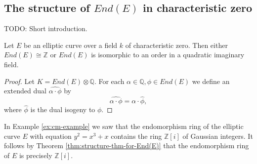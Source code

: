 \subsection{The structure of $End(E)$ in characteristic zero}
\label{sec:struct-ende-char-zero}

TODO: Short introduction.

\begin{thm}
  \label{thm:structure-thm-for-End(E)}
  Let $E$ be an elliptic curve over a field $k$ of characteristic zero.  Then either
  $End(E) \cong \mathbb{Z}$ or $End(E)$ is isomorphic to an order in a quadratic
  imaginary field.
\end{thm}
\begin{proof}
  Let $K = End(E) \otimes \mathbb{Q}$.  For each $\alpha \in \mathbb{Q}, \phi \in
  End(E)$ we define an extended dual $\widehat{\alpha \cdot \phi}$ by
  \begin{equation*}
    \widehat{\alpha \cdot \phi} = \alpha \cdot \hat{\phi},
  \end{equation*}
  where $\hat{\phi}$ is the dual isogeny to $\phi$.  
\end{proof}

In Example \ref{ex:cm-example} we saw that the endomorphism ring of the elliptic
curve $E$ with equation $y^{2} = x^{3} + x$ contains the ring $\mathbb{Z}[i]$ of
Gaussian integers.  It follows by Theorem \ref{thm:structure-thm-for-End(E)} that the
endomorphism ring of $E$ is precisely $\mathbb{Z}[i]$.

